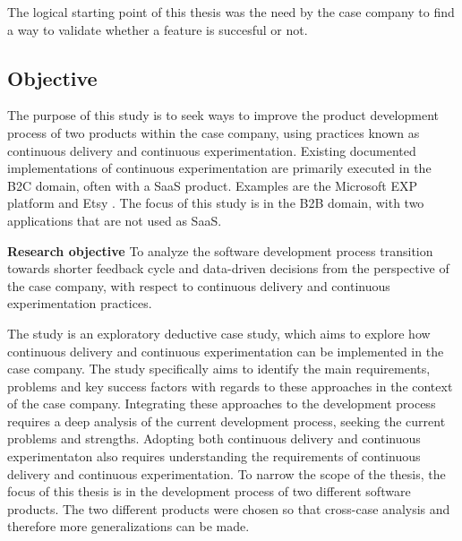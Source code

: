 \documentclass[english]{tktltiki2}
\theoremstyle{definition}
\theoremstyle{remark}
\begin{document}

The logical starting point of this thesis was the need by the case company to find a way to validate whether a feature is succesful or not. 

\subsection{Objective} %
The purpose of this study is to seek ways to improve the product development process of two products within the case company, using practices known as continuous delivery and continuous experimentation. Existing documented implementations of continuous experimentation are primarily executed in the B2C domain, often with a SaaS product. Examples are the Microsoft EXP platform \cite{ep} and Etsy \cite{}. The focus of this study is in the B2B domain, with two applications that are not used as SaaS. 

\bigskip
\noindent \textbf{Research objective}
To analyze the software development process transition towards shorter feedback cycle and data-driven decisions from the perspective of the case company, with respect to continuous delivery and continuous experimentation practices.

The study is an exploratory deductive case study, which aims to explore how continuous delivery and continuous experimentation can be implemented in the case company. The study specifically aims to identify the main requirements, problems and key success factors with regards to these approaches in the context of the case company. Integrating these approaches to the development process requires a deep analysis of the current development process, seeking the current problems and strengths. Adopting both continuous delivery and continuous experimentaton also requires understanding the requirements of continuous delivery and continuous experimentation. To narrow the scope of the thesis, the focus of this thesis is in the development process of two different software products. The two different products were chosen so that cross-case analysis and therefore more generalizations can be made.
\end{document}

